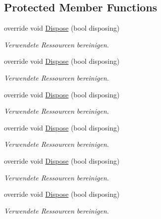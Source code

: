 \subsection*{Protected Member Functions}
\begin{DoxyCompactItemize}
\item 
override void \hyperlink{class_assessment___two_1_1_main_window_a3be02bf3666f0498bba373d5686bba31}{Dispose} (bool disposing)
\begin{DoxyCompactList}\small\item\em Verwendete Ressourcen bereinigen. \item\end{DoxyCompactList}\item 
override void \hyperlink{class_assessment___two_1_1_main_window_a3be02bf3666f0498bba373d5686bba31}{Dispose} (bool disposing)
\begin{DoxyCompactList}\small\item\em Verwendete Ressourcen bereinigen. \item\end{DoxyCompactList}\item 
override void \hyperlink{class_assessment___two_1_1_main_window_a3be02bf3666f0498bba373d5686bba31}{Dispose} (bool disposing)
\begin{DoxyCompactList}\small\item\em Verwendete Ressourcen bereinigen. \item\end{DoxyCompactList}\item 
override void \hyperlink{class_assessment___two_1_1_main_window_a3be02bf3666f0498bba373d5686bba31}{Dispose} (bool disposing)
\begin{DoxyCompactList}\small\item\em Verwendete Ressourcen bereinigen. \item\end{DoxyCompactList}\item 
override void \hyperlink{class_assessment___two_1_1_main_window_a3be02bf3666f0498bba373d5686bba31}{Dispose} (bool disposing)
\begin{DoxyCompactList}\small\item\em Verwendete Ressourcen bereinigen. \item\end{DoxyCompactList}\item 
override void \hyperlink{class_assessment___two_1_1_main_window_a3be02bf3666f0498bba373d5686bba31}{Dispose} (bool disposing)
\begin{DoxyCompactList}\small\item\em Verwendete Ressourcen bereinigen. \item\end{DoxyCompactList}\item 

\end{DoxyCompactItemize}

